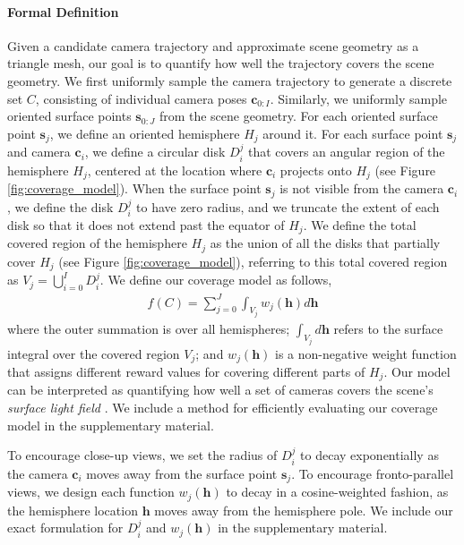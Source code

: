 \paragraph{Formal Definition}
Given a candidate camera trajectory and approximate scene geometry as a triangle mesh, our goal is to quantify how well the trajectory covers the scene geometry.
We first uniformly sample the camera trajectory to generate a discrete set $C$, consisting of individual camera poses $\mathbf{c}_{0:I}$.
Similarly, we uniformly sample oriented surface points $\mathbf{s}_{0:J}$ from the scene geometry.
For each oriented surface point $\mathbf{s}_j$, we define an oriented hemisphere $H_j$ around it.
For each surface point $\mathbf{s}_j$ and camera $\mathbf{c}_i$, we define a circular disk $D^j_i$ that covers an angular region of the hemisphere $H_j$, centered at the location where $\mathbf{c}_i$ projects onto $H_j$ (see Figure \ref{fig:coverage_model}).
When the surface point $\mathbf{s}_j$ is not visible from the camera $\mathbf{c}_i$, we define the disk $D^j_i$ to have zero radius, and we truncate the extent of each disk so that it does not extend past the equator of $H_j$.
We define the total covered region of the hemisphere $H_j$ as the union of all the disks that partially cover $H_j$ (see Figure \ref{fig:coverage_model}), referring to this total covered region as $V_j = \bigcup_{i=0}^I D^j_i$.
We define our coverage model as follows,
%
\begin{equation}
\begin{aligned}
f(C) = \sum_{j=0}^{J} \int_{V_j} w_j(\mathbf{h}) d\mathbf{h}
\end{aligned}
\label{eqn:model_irregular}
\end{equation}
%
where the outer summation is over all hemispheres; $\int_{V_j} d\mathbf{h}$ refers to the surface integral over the covered region $V_j$; and $w_j(\mathbf{h})$ is a non-negative weight function that assigns different reward values for covering different parts of $H_j$.
Our model can be interpreted as quantifying how well a set of cameras covers the scene's \emph{surface light field} \cite{davis:2012,wood:2000}.
We include a method for efficiently evaluating our coverage model in the supplementary material.

To encourage close-up views, we set the radius of $D^j_i$ to decay exponentially as the camera $\mathbf{c}_i$ moves away from the surface point $\mathbf{s}_j$. To encourage fronto-parallel views, we design each function $w_j(\mathbf{h})$ to decay in a cosine-weighted fashion, as the hemisphere location $\mathbf{h}$ moves away from the hemisphere pole.
We include our exact formulation for $D^j_i$ and $w_j(\mathbf{h})$ in the supplementary material.

